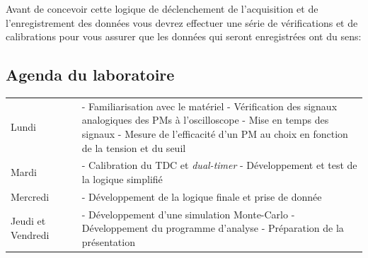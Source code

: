 Avant de concevoir cette logique de déclenchement de l'acquisition et de l'enregistrement des donn\'ees vous devrez effectuer une s\'erie de v\'erifications
et de calibrations pour vous assurer que les donn\'ees qui seront enregistrées
ont du sens:

\begin{center}
\end{center}

\subsection{Agenda du laboratoire}
\begin{tabular}{p{0.2\linewidth} p{0.8\linewidth}}
Lundi & - Familiarisation avec le matériel\newline
		- Vérification des signaux analogiques des PMs à l'oscilloscope\newline
		- Mise en temps des signaux\newline
		- Mesure de l'efficacité d’un PM au choix en fonction de la tension et du seuil\\
Mardi & - Calibration du TDC et \textit{dual-timer}\newline
		- Développement et test de la logique simplifié\\
Mercredi & - Développement de la logique finale et prise de donnée \\
Jeudi et Vendredi & - Développement d'une simulation Monte-Carlo\newline
		- Développement du programme d'analyse\newline
		- Préparation de la présentation\\
\end{tabular} 

